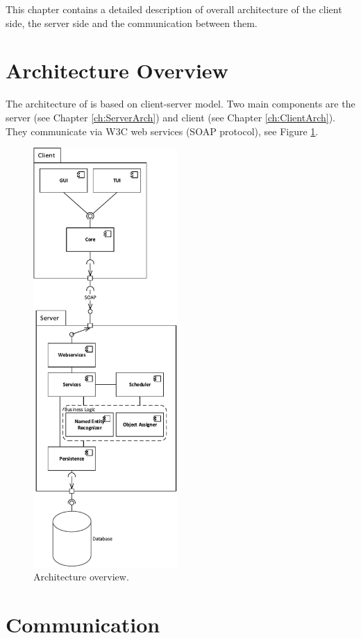 
This chapter contains a detailed description of overall architecture of the client
side, the server side and the communication between them. 

\section{Architecture Overview}

The architecture of \textan{} is based on client-server model. Two main components
are the \textan{} server (see Chapter \ref{ch:ServerArch}) and \textan{} client 
(see Chapter \ref{ch:ClientArch}). They communicate via W3C web services
(SOAP protocol), see Figure \ref{fig:Architecture}.

\begin{figure}[!htb]
        \centering
        \includegraphics[height=16cm]{Images/Architecture}
        \caption{Architecture overview.}
        \label{fig:Architecture}
\end{figure}

\section{Communication}
\label{sec:Communication}


